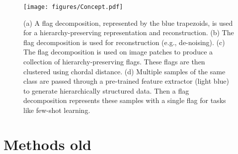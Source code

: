 




\begin{figure}[t]
    \centering
    \texttt{[image: figures/Concept.pdf]}
    \caption{(a) A flag decomposition, represented by the blue trapezoids, is used for a hierarchy-preserving representation and reconstruction. (b) The flag decomposition is used for reconstruction (e.g., de-noising). (c) The flag decomposition is used on image patches to produce a collection of hierarchy-preserving flags. These flags are then clustered using chordal distance. (d) Multiple samples of the same class are passed through a pre-trained feature extractor (light blue) to generate hierarchically structured data. Then a flag decomposition represents these samples with a single flag for tasks like few-shot learning.}
    \label{fig:concept}
\end{figure}

\clearpage
\newpage

\section{Methods old}

